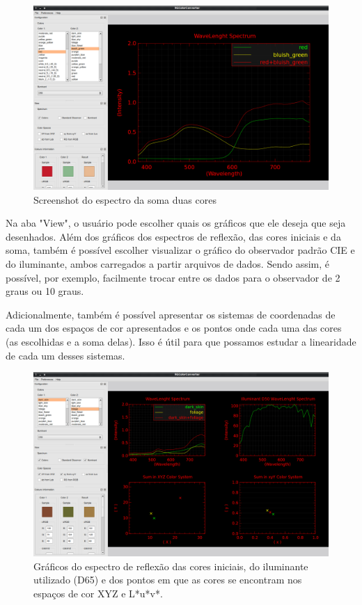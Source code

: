 \documentclass[a4paper,10pt]{report}
\begin{document}
\begin{figure}[!htb]
     \centering
     \includegraphics[scale=0.6]{img/screenshot_RGColorConverter.png}
     \caption{Screenshot do espectro da soma duas cores}
     \label{fig:screenshot_01}
\end{figure}

\par
Na aba "View", o usuário pode escolher quais os gráficos que ele deseja
que seja desenhados. Além dos gráficos dos espectros de reflexão, das cores
iniciais e da soma, também é possível escolher visualizar o gráfico do
observador padrão CIE e do iluminante, ambos carregados a partir arquivos de
dados. Sendo assim, é possível, por exemplo, facilmente trocar entre os dados
para o observador de 2 graus ou 10 graus.

\par
Adicionalmente, também é possível apresentar os sistemas de coordenadas de cada
um dos espaços de cor apresentados e os pontos onde cada uma das cores (as
escolhidas e a soma delas). Isso é útil para que possamos estudar a linearidade
de cada um desses sistemas.

\begin{figure}[!htb]
     \centering
\includegraphics[scale=0.6]
{img/screenshot_RGColorConverter_XYZ_Illuminant_xyY.png}
     \caption{Gráficos do espectro de reflexão das cores iniciais, do
iluminante utilizado (D65) e dos pontos em que as cores se encontram nos
espaços de cor XYZ e L*u*v*.}
     \label{fig:screenshot_XYZ_illuminant_Luv}
\end{figure}
\end{document}
